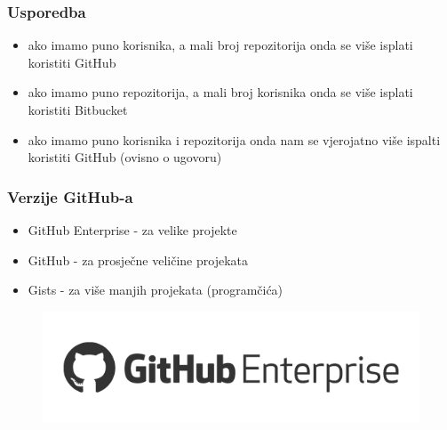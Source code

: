 \documentclass[12p, Times New Roman]{beamer}
\begin{document}
	\begin{frame}				%
		\frametitle{Usporedba}

		\begin{itemize}
			\item ako imamo puno korisnika, a mali broj repozitorija onda se više isplati koristiti GitHub
			\item ako imamo puno repozitorija, a mali broj korisnika onda se više isplati koristiti Bitbucket
			\item ako imamo puno korisnika i repozitorija onda nam se vjerojatno više ispalti koristiti GitHub (ovisno o ugovoru)

		\end{itemize}


	\end{frame}

	\begin{frame}				%
		\frametitle{Verzije GitHub-a}
		\begin{itemize}
			\item GitHub Enterprise - za velike projekte
			\item GitHub - za prosječne veličine projekata
			\item Gists - za više manjih projekata (programčića)

		\end{itemize}

		\begin{figure}
			\begin{center}
				\includegraphics[scale=0.9]{enterprise.png}
			\end{center}
		\end{figure}

	\end{frame}
\end{document}
